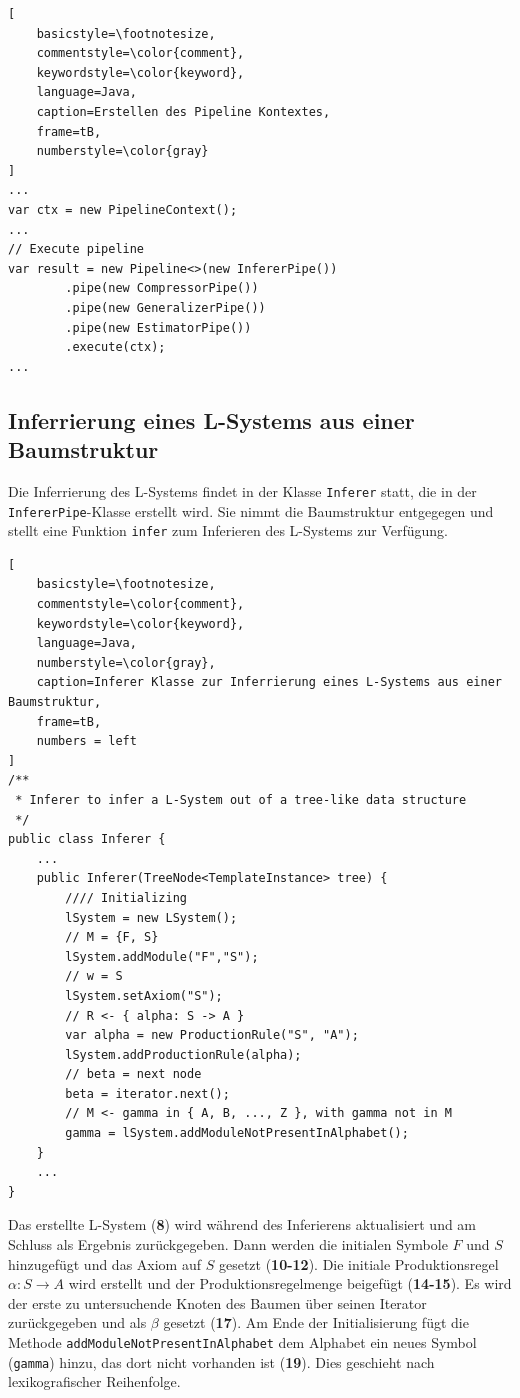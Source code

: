 \newpage

\begin{lstlisting}[
    basicstyle=\footnotesize,
    commentstyle=\color{comment},
    keywordstyle=\color{keyword},
    language=Java,
    caption=Erstellen des Pipeline Kontextes,
    frame=tB,
    numberstyle=\color{gray}
]
...
var ctx = new PipelineContext();
...
// Execute pipeline
var result = new Pipeline<>(new InfererPipe())
        .pipe(new CompressorPipe())
        .pipe(new GeneralizerPipe())
        .pipe(new EstimatorPipe())
        .execute(ctx);
...
\end{lstlisting}

\subsection*{Inferrierung eines L-Systems aus einer Baumstruktur}
Die Inferrierung des L-Systems findet in der Klasse \texttt{Inferer} statt, die in der \texttt{InfererPipe}-Klasse erstellt wird.
Sie nimmt die Baumstruktur entgegegen und stellt eine Funktion \texttt{infer} zum Inferieren des L-Systems zur Verfügung.
\begin{lstlisting}[
    basicstyle=\footnotesize,
    commentstyle=\color{comment},
    keywordstyle=\color{keyword},
    language=Java,
    numberstyle=\color{gray},
    caption=Inferer Klasse zur Inferrierung eines L-Systems aus einer Baumstruktur,
    frame=tB,
    numbers = left
]
/**
 * Inferer to infer a L-System out of a tree-like data structure
 */
public class Inferer {
    ...
    public Inferer(TreeNode<TemplateInstance> tree) {
        //// Initializing
        lSystem = new LSystem();
        // M = {F, S}
        lSystem.addModule("F","S");
        // w = S
        lSystem.setAxiom("S");
        // R <- { alpha: S -> A }
        var alpha = new ProductionRule("S", "A");
        lSystem.addProductionRule(alpha);
        // beta = next node
        beta = iterator.next();
        // M <- gamma in { A, B, ..., Z }, with gamma not in M
        gamma = lSystem.addModuleNotPresentInAlphabet();
    }
    ...
}
\end{lstlisting}

Das erstellte L-System (\textbf{8}) wird während des Inferierens aktualisiert und am Schluss als Ergebnis zurückgegeben.
Dann werden die initialen Symbole $F$ und $S$ hinzugefügt und das Axiom auf $S$ gesetzt (\textbf{10-12}).
Die initiale Produktionsregel $\alpha: S \rightarrow A$ wird erstellt und der Produktionsregelmenge beigefügt (\textbf{14-15}).
Es wird der erste zu untersuchende Knoten des Baumen über seinen Iterator zurückgegeben und als $\beta$ gesetzt (\textbf{17}).
Am Ende der Initialisierung fügt die Methode \texttt{addModuleNotPresentInAlphabet} dem Alphabet ein neues Symbol (\texttt{gamma}) hinzu,
das dort nicht vorhanden ist (\textbf{19}).
Dies geschieht nach lexikografischer Reihenfolge.

